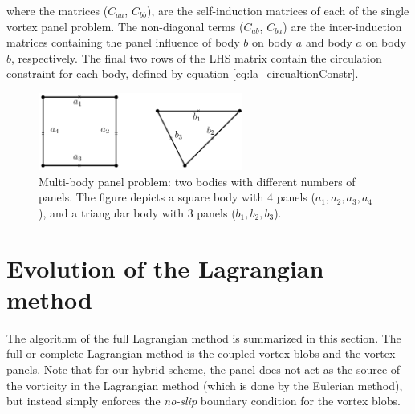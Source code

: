 where the matrices ($C_{aa}$, $C_{bb}$), are the self-induction matrices of each of the single vortex panel problem. The non-diagonal terms ($C_{ab}$, $C_{ba}$) are the inter-induction matrices containing the panel influence of 
body $b$ on body $a$ and body $a$ on body $b$, respectively. The final two rows of the LHS matrix contain the circulation constraint for each body, defined by equation \ref{eq:la_circualtionConstr}.

	\begin{figure}[t]
	\centering
	\includegraphics[width=0.6\textwidth]{figures/lagrangian/twoPanelBodies.pdf}
	\caption{Multi-body panel problem: two bodies with different numbers of panels. The figure depicts a square body with 4 panels ($a_1, a_2, a_3, a_4$), and a triangular body with 3 panels ($b_1, b_2, b_3$). }
	\label{fig:twoPanelBodies}
	\end{figure}




\section{Evolution of the Lagrangian method}
\label{sec:la-eolm}
The algorithm of the full Lagrangian method is summarized in this section. The full or complete	Lagrangian method is the coupled vortex blobs and the vortex panels. Note that for our hybrid scheme, the panel does not act as the source of the vorticity in the Lagrangian method (which is done by the Eulerian method), but instead simply enforces the \emph{no-slip} boundary condition for the vortex blobs.
	
